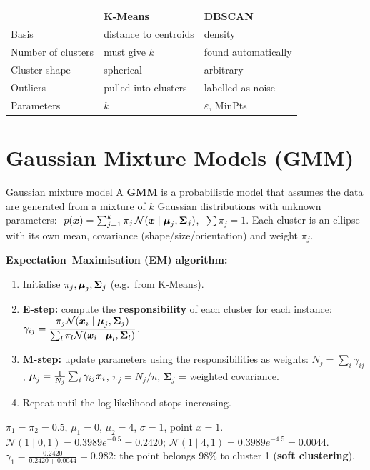 \begin{center}
\small
\begin{tabular}{@{}p{3cm}p{6.6cm}p{6.6cm}@{}}
\toprule
 & \textbf{K-Means} & \textbf{DBSCAN}\\
\midrule
Basis & distance to centroids & density\\
Number of clusters & must give $k$ & found automatically\\
Cluster shape & spherical & arbitrary\\
Outliers & pulled into clusters & labelled as noise\\
Parameters & $k$ & $\varepsilon$, MinPts\\
\bottomrule
\end{tabular}
\end{center}

\section{Gaussian Mixture Models (GMM)}
\begin{dfn}{Gaussian mixture model}
A \textbf{GMM} is a probabilistic model that assumes the data are generated from a mixture of $k$ Gaussian distributions with unknown parameters:
$\ p(\boldsymbol{x})=\sum_{j=1}^k\pi_j\,\mathcal N(\boldsymbol{x}\mid\boldsymbol{\mu}_j,\mathbf\Sigma_j)$, $\ \sum\pi_j=1$.
Each cluster is an ellipse with its own mean, covariance (shape/size/orientation) and weight $\pi_j$.
\end{dfn}
\textbf{Expectation--Maximisation (EM) algorithm:}
\begin{enumerate}
  \item Initialise $\pi_j,\boldsymbol{\mu}_j,\mathbf\Sigma_j$ (e.g.\ from K-Means).
  \item \textbf{E-step:} compute the \textbf{responsibility} of each cluster for each instance:
  $\gamma_{ij}=\dfrac{\pi_j\mathcal N(\boldsymbol{x}_i\mid\boldsymbol{\mu}_j,\mathbf\Sigma_j)}{\sum_l\pi_l\mathcal N(\boldsymbol{x}_i\mid\boldsymbol{\mu}_l,\mathbf\Sigma_l)}$.
  \item \textbf{M-step:} update parameters using the responsibilities as weights: $N_j=\sum_i\gamma_{ij}$, $\boldsymbol{\mu}_j=\frac1{N_j}\sum_i\gamma_{ij}\boldsymbol{x}_i$, $\pi_j=N_j/n$, $\mathbf\Sigma_j$ = weighted covariance.
  \item Repeat until the log-likelihood stops increasing.
\end{enumerate}
\begin{numer}[: E-step in 1-D]
$\pi_1=\pi_2=0.5$, $\mu_1=0$, $\mu_2=4$, $\sigma=1$, point $x=1$.\\
$\mathcal N(1\mid0,1)=0.3989e^{-0.5}=0.2420$; $\mathcal N(1\mid4,1)=0.3989e^{-4.5}=0.0044$.\\
$\gamma_1=\frac{0.2420}{0.2420+0.0044}=\mathbf{0.982}$: the point belongs 98\% to cluster 1 (\textbf{soft clustering}).
\end{numer}
